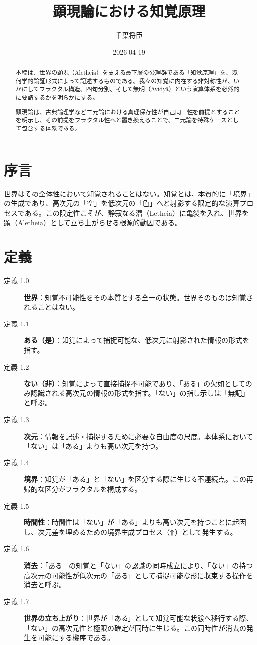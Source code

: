 \documentclass[11pt,a4paper]{ltjsarticle}
\begin{document}
\title{顕現論における知覚原理}
\author{千葉将臣}
\date{2026-04-19}
\maketitle

\begin{abstract}
  本稿は、世界の顕現（Aletheia）を支える最下層の公理群である「知覚原理」を、幾何学的論証形式によって記述するものである。我々の知覚に内在する非対称性が、いかにしてフラクタル構造、四句分別、そして無明（Avidyā）という演算体系を必然的に要請するかを明らかにする。

  顕現論は、古典論理学など二元論における真理保存性が自己同一性を前提とすることを明示し、その前提をフラクタル性へと置き換えることで、二元論を特殊ケースとして包含する体系である。
\end{abstract}

\section*{序言}
世界はその全体性において知覚されることはない。知覚とは、本質的に「境界」の生成であり、高次元の「空」を低次元の「色」へと射影する限定的な演算プロセスである。この限定性こそが、静寂なる潜（Letheia）に亀裂を入れ、世界を顕（Aletheia）として立ち上がらせる根源的動因である。

\section{定義}

\begin{description}
  \item[定義 1.0] \textbf{世界}：知覚不可能性をその本質とする全一の状態。世界そのものは知覚されることはない。
  \item[定義 1.1] \textbf{ある（是）}：知覚によって捕捉可能な、低次元に射影された情報の形式を指す。
  \item[定義 1.2] \textbf{ない（非）}：知覚によって直接捕捉不可能であり、「ある」の欠如としてのみ認識される高次元の情報の形式を指す。「ない」の指し示しは「無記」と呼ぶ。
  \item[定義 1.3] \textbf{次元}：情報を記述・捕捉するために必要な自由度の尺度。本体系において「ない」は「ある」よりも高い次元を持つ。
  \item[定義 1.4] \textbf{境界}：知覚が「ある」と「ない」を区分する際に生じる不連続点。この再帰的な区分がフラクタルを構成する。
  \item[定義 1.5] \textbf{時間性}：時間性は「ない」が「ある」よりも高い次元を持つことに起因し、次元差を埋めるための境界生成プロセス（$\Uparrow$）として発生する。
  \item[定義 1.6] \textbf{消去}：「ある」の知覚と「ない」の認識の同時成立により、「ない」の持つ高次元の可能性が低次元の「ある」として捕捉可能な形に収束する操作を消去と呼ぶ。
  \item[定義 1.7] \textbf{世界の立ち上がり}：世界が「ある」として知覚可能な状態へ移行する際、「ない」の高次元性と極限の確定が同時に生じる。この同時性が消去の発生を可能にする機序である。
\end{description}    
\end{document}
